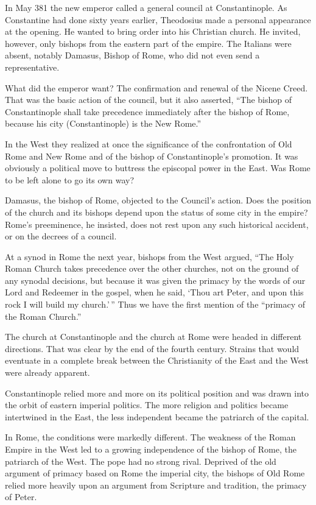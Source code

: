 In May 381 the new emperor called a general council at Constantinople. As Constantine had done sixty
years earlier, Theodosius made a personal appearance at the opening. He wanted to bring order into
his Christian church. He invited, however, only bishops from the eastern part of the empire. The
Italians were absent, notably Damasus, Bishop of Rome, who did not even send a representative.

What did the emperor want? The confirmation and renewal of the Nicene Creed. That was the basic
action of the council, but it also asserted, “The bishop of Constantinople shall take precedence
immediately after the bishop of Rome, because his city (Constantinople) is the New Rome.”

In the West they realized at once the significance of the confrontation of Old Rome and New Rome and
of the bishop of Constantinople’s promotion. It was obviously a political move to buttress the
episcopal power in the East. Was Rome to be left alone to go its own way?

Damasus, the bishop of Rome, objected to the Council’s action. Does the position of the church and
its bishops depend upon the status of some city in the empire? Rome’s preeminence, he insisted, does
not rest upon any such historical accident, or on the decrees of a council.

At a synod in Rome the next year, bishops from the West argued, “The Holy Roman Church takes
precedence over the other churches, not on the ground of any synodal decisions, but because it was
given the primacy by the words of our Lord and Redeemer in the gospel, when he said, ‘Thou art
Peter, and upon this rock I will build my church.’\,” Thus we have the first mention of the “primacy
of the Roman Church.”

The church at Constantinople and the church at Rome were headed in different directions. That was
clear by the end of the fourth century. Strains that would eventuate in a complete break between the
Christianity of the East and the West were already apparent.

Constantinople relied more and more on its political position and was drawn into the orbit of
eastern imperial politics. The more religion and politics became intertwined in the East, the less
independent became the patriarch of the capital.

In Rome, the conditions were markedly different. The weakness of the Roman Empire in the West led to
a growing independence of the bishop of Rome, the patriarch of the West. The pope had no strong
rival. Deprived of the old argument of primacy based on Rome the imperial city, the bishops of Old
Rome relied more heavily upon an argument from Scripture and tradition, the primacy of Peter.

